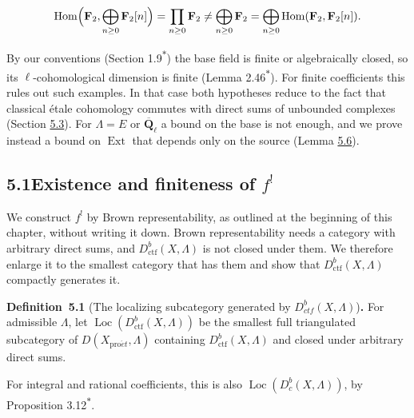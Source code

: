 \documentclass[11pt]{article}
\newenvironment{bpstatement}[2]{\par\addvspace{0.6\baselineskip}\noindent\textbf{#1}#2\textbf{.}\enspace\ignorespaces}
  {\par\addvspace{0.4\baselineskip}}
\newcommand{\bpout}[1]{#1\textsuperscript{\hyperlink{bp-outside}{\ensuremath{\ast}}}}
\providecommand{\Dbc}{}\renewcommand{\Dbc}{D^b_c}
\providecommand{\Dctf}{}\renewcommand{\Dctf}{D^b_{ctf}}
\providecommand{\Ext}{}\renewcommand{\Ext}{\operatorname{Ext}}
\providecommand{\Hom}{}\renewcommand{\Hom}{\operatorname{Hom}}
\providecommand{\Loc}{}\renewcommand{\Loc}{\operatorname{Loc}}
\begin{document}
\[
\Hom\Bigl(\mathbf F_2,\bigoplus_{n\ge0}\mathbf F_2[n]\Bigr)
=\prod_{n\ge0}\mathbf F_2
\ne\bigoplus_{n\ge0}\mathbf F_2
=\bigoplus_{n\ge0}\Hom(\mathbf F_2,\mathbf F_2[n]).
\]

By our conventions (Section \bpout{1.9}) the base field is finite or algebraically closed, so its \(\ell\)-cohomological dimension is finite (Lemma \bpout{2.46}). For finite coefficients this rules out such examples. In that case both hypotheses reduce to the fact that classical étale cohomology commutes with direct sums of unbounded complexes (Section \hyperref[bp43]{5.3}). For \(\Lambda=E\) or \(\overline{\mathbf Q}_\ell\) a bound on the base is not enough, and we prove instead a bound on \(\Ext\) that depends only on the source (Lemma \hyperref[bp20]{5.6}).

\subsection*{\texorpdfstring{5.1\quad Existence and finiteness of $f^!$}{5.1 Existence and finiteness of f!}}
\label{bp3}%
\label{bp4}%
We construct \(f^!\) by Brown representability, as outlined at the beginning of this chapter, without writing it down. Brown representability needs a category with arbitrary direct sums, and \(D^b_{\mathrm{ctf}}(X,\Lambda)\) is not closed under them. We therefore enlarge it to the smallest category that has them and show that \(D^b_{\mathrm{ctf}}(X,\Lambda)\) compactly generates it.

\label{bp5}%
\begin{bpstatement}{Definition~5.1}{ (The localizing subcategory generated by $\Dctf(X,\Lambda)$)}
For admissible \(\Lambda\), let \(\Loc(D^b_{\mathrm{ctf}}(X,\Lambda))\) be the smallest full triangulated subcategory of \(D(X_{\mathrm{pro}\acute{e}t},\Lambda)\) containing \(D^b_{\mathrm{ctf}}(X,\Lambda)\) and closed under arbitrary direct sums.
\end{bpstatement}

\label{bp6}%
For integral and rational coefficients, this is also \(\Loc(\Dbc(X,\Lambda))\), by Proposition \bpout{3.12}.
\end{document}

